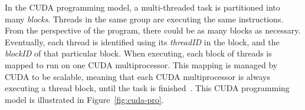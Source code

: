 

In the CUDA programming model, a multi-threaded task is partitioned into 
many \textit{blocks}.
%
Threads in the same group are executing the same instructions.
%
From the perspective of the program, there could be as many blocks
as necessary.
%
Eventually, each thread is identified using its \textit{threadID} in 
the block, and the \textit{blockID} of that particular block.
%
When executing, each block of threads is mapped to run on one CUDA 
multiprocessor. 
%
This mapping is managed by CUDA to be scalable, meaning that each CUDA 
multiprocessor is always executing a thread block, until the task
is finished~\cite{cudaprogramming}.
%
This CUDA programming model is illustrated in Figure~\ref{fig:cuda-pro}.



